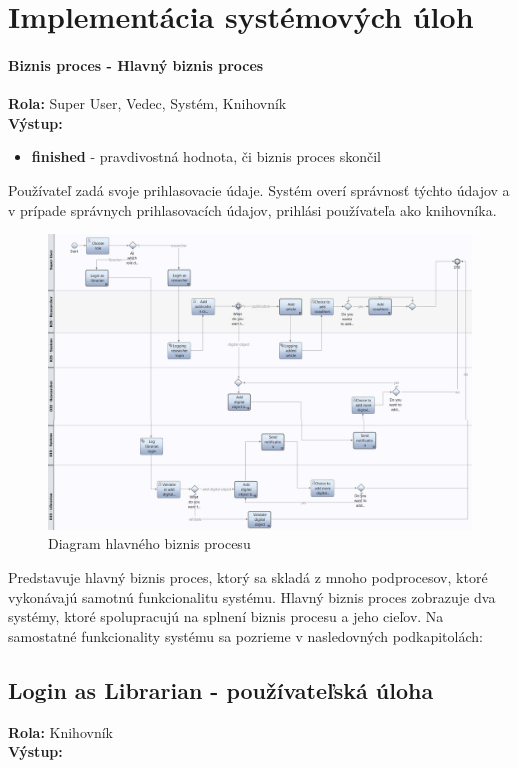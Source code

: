 \documentclass[10pt,oneside,slovak,a4paper]{article}
\begin{document}
\section{Implementácia systémových úloh}
\paragraph{Biznis proces - Hlavný biznis proces}
\textbf{Rola:} Super User, Vedec, Systém, Knihovník\\
\textbf{Výstup:}

\begin{itemize}
\item \textbf{finished} - pravdivostná hodnota, či biznis proces skončil
\end{itemize}

Používateľ zadá svoje prihlasovacie údaje. Systém overí správnosť týchto údajov a v prípade správnych prihlasovacích údajov, prihlási používateľa ako knihovníka.

\begin{figure} [H]
\centering
\includegraphics[scale=0.35]{diagrams/diagUpload.jpg} 
\caption{Diagram hlavného biznis procesu}
\end{figure}

Predstavuje hlavný biznis proces, ktorý sa skladá z mnoho podprocesov, ktoré vykonávajú samotnú funkcionalitu systému. Hlavný biznis proces zobrazuje dva systémy, ktoré spolupracujú na splnení biznis procesu a jeho cieľov. Na samostatné funkcionality systému sa pozrieme v nasledovných podkapitolách:

\subsection{Login as Librarian - používateľská úloha}
\textbf{Rola:} Knihovník\\
\textbf{Výstup:}
\end{document}

